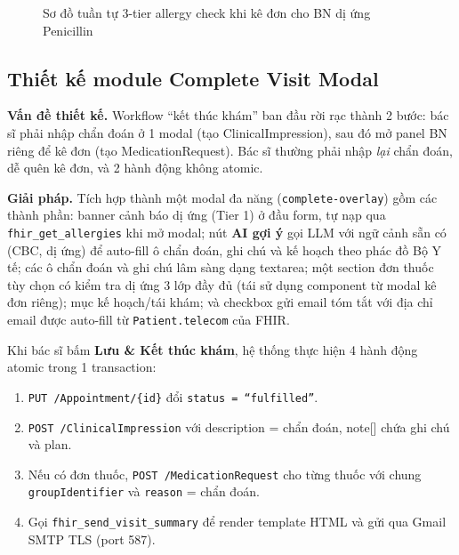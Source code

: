 \documentclass[a4paper,13pt,3p,twoside,openany]{report}
\theoremstyle{definition}
\theoremstyle{remark}
\theoremstyle{definition}
\let\ORIGsubsection\subsection
\renewcommand{\subsection}{\needspace{3\baselineskip}\ORIGsubsection}
\begin{document}
\begin{figure}[H]
\caption{Sơ đồ tuần tự 3-tier allergy check khi kê đơn cho BN dị ứng Penicillin}
\label{fig:seq-flow-rx}
\end{figure}

\subsection{Thiết kế module Complete Visit Modal}

\textbf{Vấn đề thiết kế.} Workflow ``kết thúc khám'' ban đầu rời rạc thành 2 bước: bác sĩ phải nhập chẩn đoán ở 1 modal (tạo ClinicalImpression), sau đó mở panel BN riêng để kê đơn (tạo MedicationRequest). Bác sĩ thường phải nhập \textit{lại} chẩn đoán, dễ quên kê đơn, và 2 hành động không atomic.

\textbf{Giải pháp.} Tích hợp thành một modal đa năng (\texttt{complete-overlay}) gồm các thành phần: banner cảnh báo dị ứng (Tier 1) ở đầu form, tự nạp qua \texttt{fhir\_get\_allergies} khi mở modal; nút \textbf{AI gợi ý} gọi LLM với ngữ cảnh sẵn có (CBC, dị ứng) để auto-fill ô chẩn đoán, ghi chú và kế hoạch theo phác đồ Bộ Y tế; các ô chẩn đoán và ghi chú lâm sàng dạng textarea; một section đơn thuốc tùy chọn có kiểm tra dị ứng 3 lớp đầy đủ (tái sử dụng component từ modal kê đơn riêng); mục kế hoạch/tái khám; và checkbox gửi email tóm tắt với địa chỉ email được auto-fill từ \texttt{Patient.telecom} của FHIR.

Khi bác sĩ bấm \textbf{Lưu \& Kết thúc khám}, hệ thống thực hiện 4 hành động atomic trong 1 transaction:
\begin{enumerate}
  \item \texttt{PUT /Appointment/\{id\}} đổi \texttt{status = ``fulfilled''}.
  \item \texttt{POST /ClinicalImpression} với description = chẩn đoán, note[] chứa ghi chú và plan.
  \item Nếu có đơn thuốc, \texttt{POST /MedicationRequest} cho từng thuốc với chung \texttt{groupIdentifier} và \texttt{reason} = chẩn đoán.
  \item Gọi \texttt{fhir\_send\_visit\_summary} để render template HTML và gửi qua Gmail SMTP TLS (port 587).
\end{enumerate}
\end{document}

